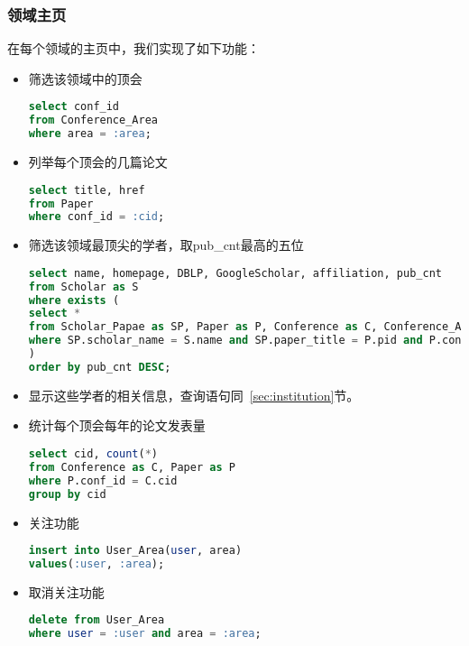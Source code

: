 \subsubsection{领域主页}
在每个领域的主页中，我们实现了如下功能：
\begin{itemize}
\item 筛选该领域中的顶会
\begin{lstlisting}[language=SQL]
select conf_id
from Conference_Area
where area = :area;
\end{lstlisting}
\item 列举每个顶会的几篇论文
\begin{lstlisting}[language=SQL]
select title, href
from Paper
where conf_id = :cid;
\end{lstlisting}
\item 筛选该领域最顶尖的学者，取pub\_cnt最高的五位
\begin{lstlisting}[language=SQL]
select name, homepage, DBLP, GoogleScholar, affiliation, pub_cnt
from Scholar as S
where exists (
select *
from Scholar_Papae as SP, Paper as P, Conference as C, Conference_Area as CA
where SP.scholar_name = S.name and SP.paper_title = P.pid and P.conf_id = C.cid and CA.conf_id = C.cid and CA.area = :area
)
order by pub_cnt DESC;
\end{lstlisting}
\item 显示这些学者的相关信息，查询语句同~\ref{sec:institution}节。
\item 统计每个顶会每年的论文发表量
\begin{lstlisting}[language=SQL]
select cid, count(*)
from Conference as C, Paper as P
where P.conf_id = C.cid
group by cid
\end{lstlisting}
\item 关注功能
\begin{lstlisting}[language=SQL]
insert into User_Area(user, area)
values(:user, :area);
\end{lstlisting}
\item 取消关注功能
\begin{lstlisting}[language=SQL]
delete from User_Area
where user = :user and area = :area;
\end{lstlisting}
\end{itemize}

